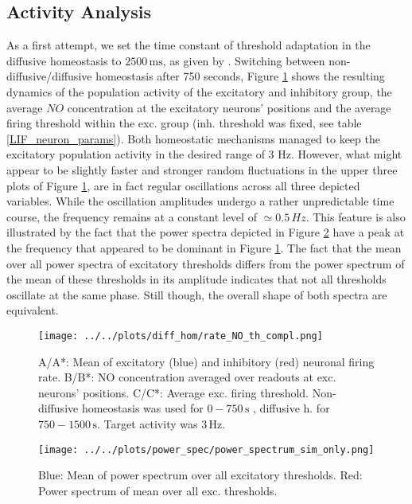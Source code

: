 \documentclass[10pt,a4paper]{article}
\begin{document}
\subsection{Activity Analysis} \label{activ_analys}
As a first attempt, we set the time constant of threshold adaptation in the diffusive homeostasis to $\mathrm{2500\, ms}$, as given by \cite{Sweeney_Paper}. Switching between non-diffusive/diffusive homeostasis after 750 seconds, Figure \ref{full_sim_osci} shows the resulting dynamics of the population activity of the excitatory and inhibitory group, the average $NO$ concentration at the excitatory neurons' positions and the average firing threshold within the exc. group (inh. threshold was fixed, see table \ref{LIF_neuron_params}). Both homeostatic mechanisms managed to keep the excitatory population activity in the desired range of 3 Hz. However, what might appear to be slightly faster and stronger random fluctuations in the upper three plots of Figure \ref{full_sim_osci}, are in fact regular oscillations across all three depicted variables. While the oscillation amplitudes undergo a rather unpredictable time course, the frequency remains at a constant level of $\simeq 0.5\, Hz$. This feature is also illustrated by the fact that the power spectra depicted in Figure \ref{Power_Spec_without_Analysis} have a peak at the frequency that appeared to be dominant in Figure \ref{full_sim_osci}. The fact that the mean over all power spectra of excitatory thresholds differs from the power spectrum of the mean of these thresholds in its amplitude indicates that not all thresholds oscillate at the same phase. Still though, the overall shape of both spectra are equivalent. 
\begin{figure}
\texttt{[image: ../../plots/diff\_hom/rate\_NO\_th\_compl.png]}
\caption{A/A*: Mean of excitatory (blue) and inhibitory (red) neuronal firing rate. B/B*: NO concentration averaged over readouts at exc. neurons' positions. C/C*: Average exc. firing threshold. Non-diffusive homeostasis was used for $\mathrm{0-750\, s}$ , diffusive h. for $\mathrm{750-1500\, s}$. Target activity was $\mathrm{3\, Hz}$.}
\label{full_sim_osci}
\end{figure}
\begin{figure}
\begin{center}
\texttt{[image: ../../plots/power\_spec/power\_spectrum\_sim\_only.png]}
\caption{Blue: Mean of power spectrum over all excitatory thresholds. Red: Power spectrum of mean over all exc. thresholds.}
\label{Power_Spec_without_Analysis}
\end{center}

\end{figure}
\end{document}
